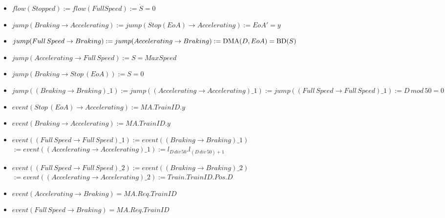 \begin{mydef}
\begin{description}
\begin{itemize}
	\item $flow(Stopped) := flow(Full Speed) := \dot{S} = 0$
 
	\end{itemize}

\item[Jump Conditions] \hspace*{0mm}
\begin{itemize}
	\item  $jump(Braking \to Accelerating) := jump(Stop (EoA) \to Accelerating) :=  EoA' = y$ 
	\item $jump(Full \, Speed \to Braking) := jump(Accelerating \to Braking) := \mathrm{DMA}(D,EoA) = \mathrm{BD}(S)$
	\item $jump(Accelerating \to Full \, Speed) := S = MaxSpeed$	
	\item $jump(Braking \to Stop \, (EoA)) := S = 0$
	\item $jump((Braking \to Braking)\_1) := jump((Accelerating \to Accelerating)\_1) := jump((Full \, Speed \to Full \, Speed)\_1) := D \, mod \, 50 = 0$
\end{itemize}

\item[Events] \hspace*{0mm}
\begin{itemize}
	\item $event (Stop \, (EoA) \to Accelerating) := MA.TrainID.y$
	\item $event (Braking \to Accelerating) := MA.TrainID.y$
	\item $event((Full \, Speed \to Full \, Speed)\_1) := event((Braking \to Braking)\_1)$ \\
                  $:= event((Accelerating \to Accelerating)\_1)  := l_{D \, div \, 50}.l_{(D \, div \, 50) +1}$
\item $event((Full \, Speed \to Full \, Speed)\_2) := event((Braking \to Braking)\_2)$  \\
        $:= event((Accelerating \to Accelerating)\_2) := Train.TrainID.Pos.D$
	\item $event(Accelerating \to Braking) = MA.Req.TrainID$
	\item $event(Full \, Speed \to Braking) = MA.Req.TrainID$
\end{itemize}

\end{description}
\end{mydef}
\medskip
